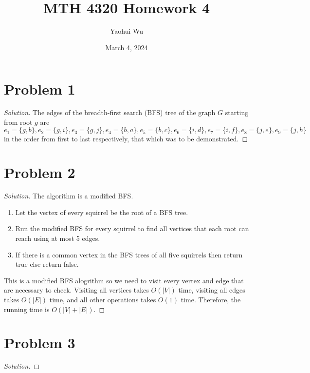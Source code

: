 \documentclass[12pt]{article}
\title{MTH 4320 Homework 4}
\author{Yaohui Wu}
\date{March 4, 2024}
\newenvironment*{solution}{\begin{proof}[Solution]}{\end{proof}}
\begin{document}
\maketitle
\section*{Problem 1}
\begin{solution}
    The edges of the breadth-first search (BFS) tree of the graph \(G\)
    starting from root \(g\) are \(e_1=\{g,b\},e_2=\{g,i\},e_3=\{g,j\},e_4=\{
        b,a\},e_5=\{b,c\},e_6=\{i,d\},e_7=\{i,f\},e_8=\{j,e\},e_9=\{j,h\}\) in
        the order from first to last respectively, that which was to be
        demonstrated.
\end{solution}
\section*{Problem 2}
\begin{solution}
    The algorithm is a modified BFS.
    \begin{enumerate}
        \item Let the vertex of every squirrel be the root of a BFS tree.
        \item Run the modified BFS  for every squirrel to find all vertices
        that each root can reach using at most 5 edges.
        \item If there is a common vertex in the BFS trees of all five
        squirrels then return true else return false.
    \end{enumerate}
    This is a modified BFS alogrithm so we need to visit every vertex and edge
    that are necessary to check. Visiting all vertices takes \(O(|V|)\) time,
    visiting all edges takes \(O(|E|)\) time, and all other operations takes
    \(O(1)\) time. Therefore, the running time is \(O(|V|+|E|)\).
\end{solution}
\section*{Problem 3}
\begin{solution}

\end{solution}
\end{document}

